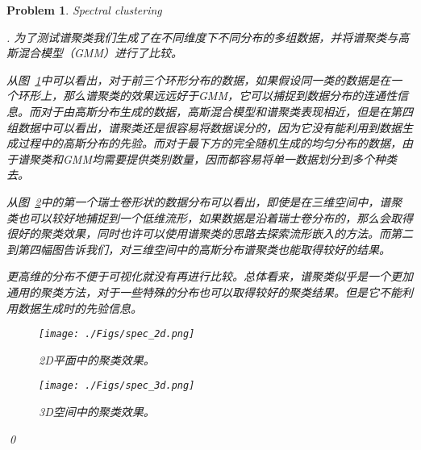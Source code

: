\documentclass[UTF8]{article}
\newtheorem{hw}{Problem}
\newenvironment{sol}
  {\par\vspace{3mm}\noindent{\it Solution}.}
  {\qed}
\begin{document}
\begin{hw}
	Spectral clustering

	\begin{sol}
		为了测试谱聚类我们生成了在不同维度下不同分布的多组数据，并将谱聚类与高斯混合模型（GMM）进行了比较。
		
		从图~\ref{fig:spec_2d}中可以看出，对于前三个环形分布的数据，如果假设同一类的数据是在一个环形上，那么谱聚类的效果远远好于GMM，它可以捕捉到数据分布的连通性信息。而对于由高斯分布生成的数据，高斯混合模型和谱聚类表现相近，但是在第四组数据中可以看出，谱聚类还是很容易将数据误分的，因为它没有能利用到数据生成过程中的高斯分布的先验。而对于最下方的完全随机生成的均匀分布的数据，由于谱聚类和GMM均需要提供类别数量，因而都容易将单一数据划分到多个种类去。
		
		从图~\ref{fig:spec_3d}中的第一个瑞士卷形状的数据分布可以看出，即使是在三维空间中，谱聚类也可以较好地捕捉到一个低维流形，如果数据是沿着瑞士卷分布的，那么会取得很好的聚类效果，同时也许可以使用谱聚类的思路去探索流形嵌入的方法。而第二到第四幅图告诉我们，对三维空间中的高斯分布谱聚类也能取得较好的结果。
		
		更高维的分布不便于可视化就没有再进行比较。总体看来，谱聚类似乎是一个更加通用的聚类方法，对于一些特殊的分布也可以取得较好的聚类结果。但是它不能利用数据生成时的先验信息。
		
		\begin{figure}
			\centering
			\vspace{-0.3cm}
			\texttt{[image: ./Figs/spec\_2d.png]}
			\caption{2D平面中的聚类效果。}
			\label{fig:spec_2d}
		\end{figure}
		\begin{figure}
			\centering
			\vspace{-0.3cm}
			\texttt{[image: ./Figs/spec\_3d.png]}
			\caption{3D空间中的聚类效果。}
			\label{fig:spec_3d}
		\end{figure}
	\end{sol}	
\end{hw}
\end{document}
